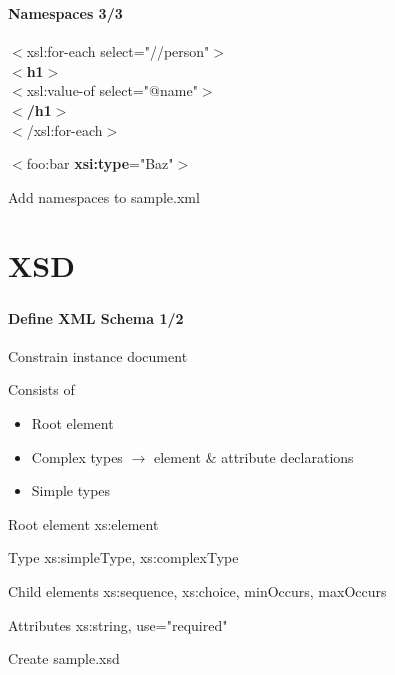 \documentclass[handout]{beamer}
\begin{document}
\begin{frame}
	\frametitle{\insertsection}
	\framesubtitle{Namespaces 3/3}
	\begin{example}
		$<$xsl:for-each select="//person"$>$ \\
			\hspace{5mm} \textbf{$<$h1$>$} \\
				\hspace{10mm} $<$xsl:value-of select="@name"$>$ \\
			\hspace{5mm} \textbf{$<$/h1$>$} \\
		$<$/xsl:for-each$>$ \\
	\end{example}
	\begin{example}
		$<$foo:bar \textbf{xsi:type}="Baz"$>$ \\
	\end{example}
	\begin{semiverbatim}
		Add namespaces to sample.xml
	\end{semiverbatim}
\end{frame}

\section{XSD}
\begin{frame}
	\frametitle{\insertsection}
	\framesubtitle{Define XML Schema 1/2}
	Constrain instance document
	\begin{block}{Consists of}
		\begin{itemize}
			\item Root element
			\item Complex types $\rightarrow$ element \& attribute declarations
			\item Simple types
		\end{itemize}
	\end{block}
	\begin{block}{Root element}
		xs:element
	\end{block}
	\begin{block}{Type}
		xs:simpleType,
		xs:complexType
	\end{block}
	\begin{block}{Child elements}
		xs:sequence,
		xs:choice,
		minOccurs,
		maxOccurs
	\end{block}
	\begin{block}{Attributes}
		xs:string, use="required"
	\end{block}
	\begin{semiverbatim}
		Create sample.xsd
	\end{semiverbatim}
\end{frame}
\end{document}
